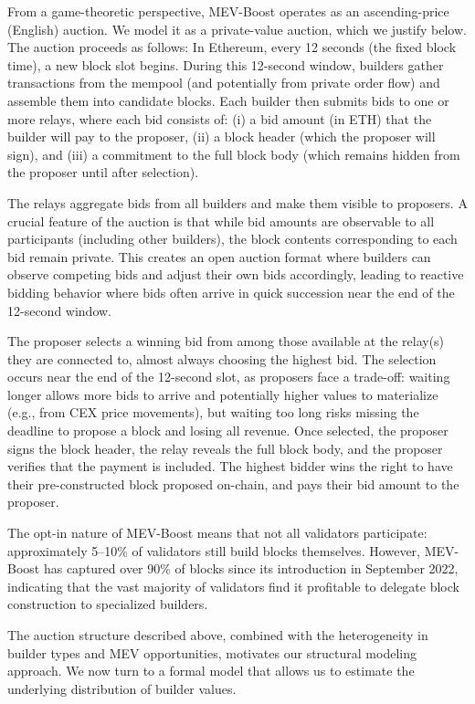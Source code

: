 \documentclass[12pt,reqno]{amsart}
\begin{document}
From a game-theoretic perspective, MEV-Boost operates as an ascending-price (English) auction. We model it as a private-value auction, which we justify below. The auction proceeds as follows: In Ethereum, every 12 seconds (the fixed block time), a new block slot begins. During this 12-second window, builders gather transactions from the mempool (and potentially from private order flow) and assemble them into candidate blocks. Each builder then submits bids to one or more relays, where each bid consists of: (i) a bid amount (in ETH) that the builder will pay to the proposer, (ii) a block header (which the proposer will sign), and (iii) a commitment to the full block body (which remains hidden from the proposer until after selection).

The relays aggregate bids from all builders and make them visible to proposers. A crucial feature of the auction is that while bid amounts are observable to all participants (including other builders), the block contents corresponding to each bid remain private. This creates an open auction format where builders can observe competing bids and adjust their own bids accordingly, leading to reactive bidding behavior where bids often arrive in quick succession near the end of the 12-second window.

The proposer selects a winning bid from among those available at the relay(s) they are connected to, almost always choosing the highest bid. The selection occurs near the end of the 12-second slot, as proposers face a trade-off: waiting longer allows more bids to arrive and potentially higher values to materialize (e.g., from CEX price movements), but waiting too long risks missing the deadline to propose a block and losing all revenue. Once selected, the proposer signs the block header, the relay reveals the full block body, and the proposer verifies that the payment is included. The highest bidder wins the right to have their pre-constructed block proposed on-chain, and pays their bid amount to the proposer.

The opt-in nature of MEV-Boost means that not all validators participate: approximately 5--10\% of validators still build blocks themselves. However, MEV-Boost has captured over 90\% of blocks since its introduction in September 2022, indicating that the vast majority of validators find it profitable to delegate block construction to specialized builders. 

The auction structure described above, combined with the heterogeneity in builder types and MEV opportunities, motivates our structural modeling approach. We now turn to a formal model that allows us to estimate the underlying distribution of builder values.
\end{document}
